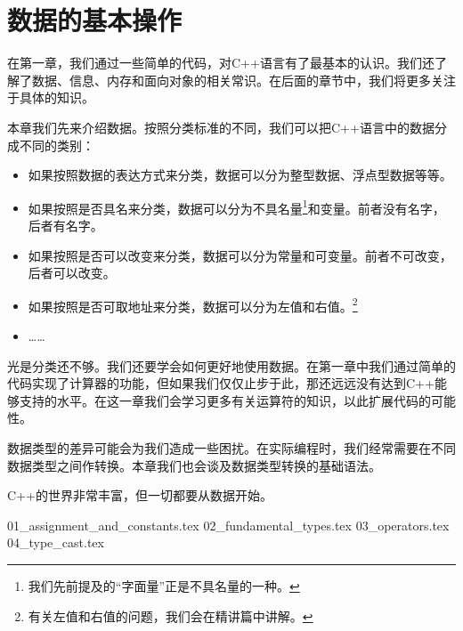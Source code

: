 \chapter{数据的基本操作}
在第一章，我们通过一些简单的代码，对C++语言有了最基本的认识。我们还了解了数据、信息、内存和面向对象的相关常识。在后面的章节中，我们将更多关注于具体的知识。\par
本章我们先来介绍数据。按照分类标准的不同，我们可以把C++语言中的数据分成不同的类别：
\begin{itemize}
    \item 如果按照数据的表达方式来分类，数据可以分为整型数据、浮点型数据等等。
    \item 如果按照是否具名来分类，数据可以分为不具名量\footnote{我们先前提及的``字面量''正是不具名量的一种。}和变量。前者没有名字，后者有名字。
    \item 如果按照是否可以改变来分类，数据可以分为常量和可变量。前者不可改变，后者可以改变。
    \item 如果按照是否可取地址来分类，数据可以分为左值和右值。\footnote{有关左值和右值的问题，我们会在精讲篇中讲解。}
    \item \ldots\ldots
\end{itemize}\par
光是分类还不够。我们还要学会如何更好地使用数据。在第一章中我们通过简单的代码实现了计算器的功能，但如果我们仅仅止步于此，那还远远没有达到C++能够支持的水平。在这一章我们会学习更多有关运算符的知识，以此扩展代码的可能性。\par
数据类型的差异可能会为我们造成一些困扰。在实际编程时，我们经常需要在不同数据类型之间作转换。本章我们也会谈及数据类型转换的基础语法。\par
C++的世界非常丰富，但一切都要从数据开始。\par
{01_assignment_and_constants.tex}
{02_fundamental_types.tex}
{03_operators.tex}
{04_type_cast.tex}
